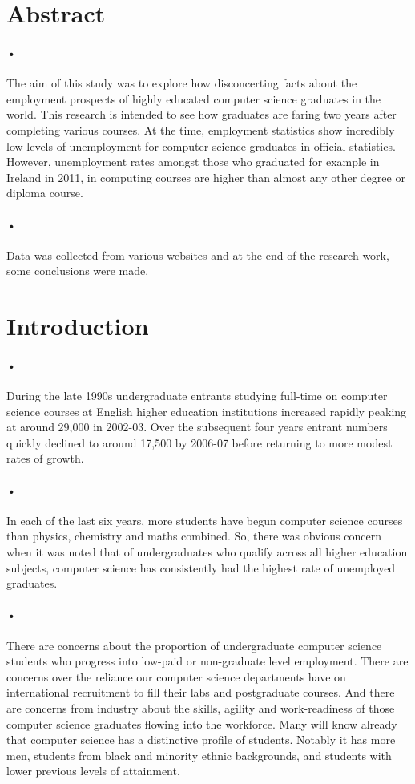 \documentclass[12pt]{article}
\begin{document}
\section{Abstract}
\paragraph{•}
The aim of this study was to explore how disconcerting facts about the employment prospects of highly educated computer science graduates in the world. This research is intended to see how graduates are faring two years after completing various courses. At the time, employment statistics show incredibly low levels of unemployment for computer science graduates in official statistics. However, unemployment rates amongst those who graduated for example in Ireland in 2011, in computing courses are higher than almost any other degree or diploma course.
\paragraph{•}
Data was collected from various websites and at the end of the research work, some conclusions were made. 

\section{Introduction}
\paragraph{•}
During the late 1990s undergraduate entrants studying full-time on computer science courses at English higher education institutions increased rapidly peaking at around 29,000 in 2002-03. Over the subsequent four years entrant numbers quickly declined to around 17,500 by 2006-07 before returning to more modest rates of growth. 
\paragraph{•}
In each of the last six years, more students have begun computer science courses than physics, chemistry and maths combined. So, there was obvious concern when it was noted that of undergraduates who qualify across all higher education subjects, computer science has consistently had the highest rate of unemployed graduates. 
\paragraph{•}
There are concerns about the proportion of undergraduate computer science students who progress into low-paid or non-graduate level employment. There are concerns over the reliance our computer science departments have on international recruitment to fill their labs and postgraduate courses. And there are concerns from industry about the skills, agility and work-readiness of those computer science graduates flowing into the workforce.
Many will know already that computer science has a distinctive profile of students. Notably it has more men, students from black and minority ethnic backgrounds, and students with lower previous levels of attainment.
\end{document}
